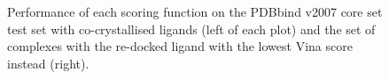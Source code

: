 \begin{figure}
\centering
{}
\caption{Performance of each scoring function on the PDBbind v2007 core set test set with co-crystallised ligands (left of each plot) and the set of complexes with the re-docked ligand with the lowest Vina score instead (right).}
\label{rfscore4:set-1-pdbbind-2007-trn-1}
\end{figure}

